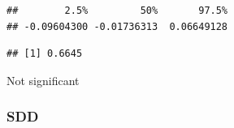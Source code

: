 \documentclass[
]{article}
\newenvironment{Shaded}{\begin{snugshade}}{\end{snugshade}}
\newcommand{\CommentTok}[1]{\textcolor[rgb]{0.56,0.35,0.01}{\textit{#1}}}
\newcommand{\DecValTok}[1]{\textcolor[rgb]{0.00,0.00,0.81}{#1}}
\newcommand{\FunctionTok}[1]{\textcolor[rgb]{0.00,0.00,0.00}{#1}}
\newcommand{\NormalTok}[1]{#1}
\newcommand{\SpecialCharTok}[1]{\textcolor[rgb]{0.00,0.00,0.00}{#1}}
\begin{document}
\begin{verbatim}
##        2.5%         50%       97.5% 
## -0.09604300 -0.01736313  0.06649128
\end{verbatim}

\begin{Shaded}
\end{Shaded}

\begin{verbatim}
## [1] 0.6645
\end{verbatim}

Not significant

\hypertarget{sdd-1}{%
\subsubsection{SDD}\label{sdd-1}}
\end{document}
